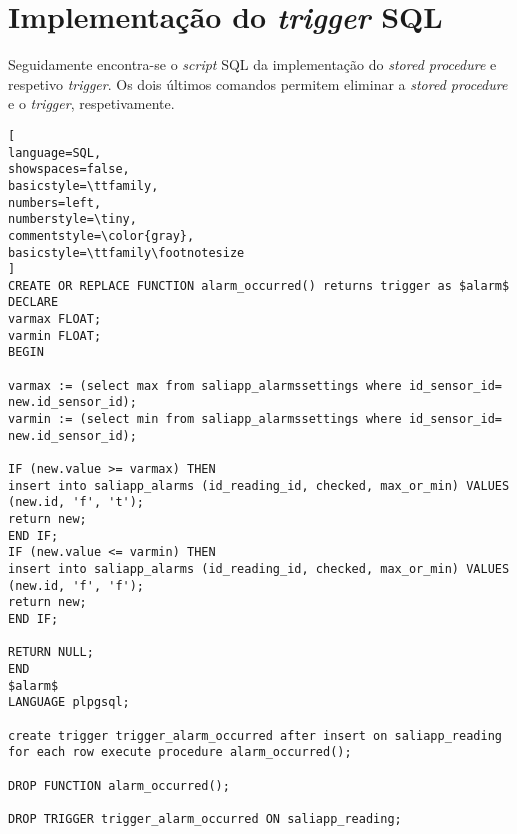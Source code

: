 \chapter{Implementação do \textit{trigger} \acs{SQL} }
\label{triggerSQLImpe}


Seguidamente encontra-se o \textit{script} SQL da implementação do \textit{stored procedure} e respetivo \textit{trigger}. Os dois últimos comandos permitem eliminar a \textit{stored procedure} e o \textit{trigger}, respetivamente. 

\begin{lstlisting}[
language=SQL,
showspaces=false,
basicstyle=\ttfamily,
numbers=left,
numberstyle=\tiny,
commentstyle=\color{gray},
basicstyle=\ttfamily\footnotesize
]
CREATE OR REPLACE FUNCTION alarm_occurred() returns trigger as $alarm$ 
DECLARE
varmax FLOAT;
varmin FLOAT;
BEGIN

varmax := (select max from saliapp_alarmssettings where id_sensor_id= new.id_sensor_id);
varmin := (select min from saliapp_alarmssettings where id_sensor_id= new.id_sensor_id);

IF (new.value >= varmax) THEN 
insert into saliapp_alarms (id_reading_id, checked, max_or_min) VALUES (new.id, 'f', 't');
return new;
END IF;
IF (new.value <= varmin) THEN 
insert into saliapp_alarms (id_reading_id, checked, max_or_min) VALUES (new.id, 'f', 'f');
return new;
END IF;

RETURN NULL;
END
$alarm$
LANGUAGE plpgsql;

create trigger trigger_alarm_occurred after insert on saliapp_reading
for each row execute procedure alarm_occurred(); 

DROP FUNCTION alarm_occurred(); 

DROP TRIGGER trigger_alarm_occurred ON saliapp_reading;


\end{lstlisting}
